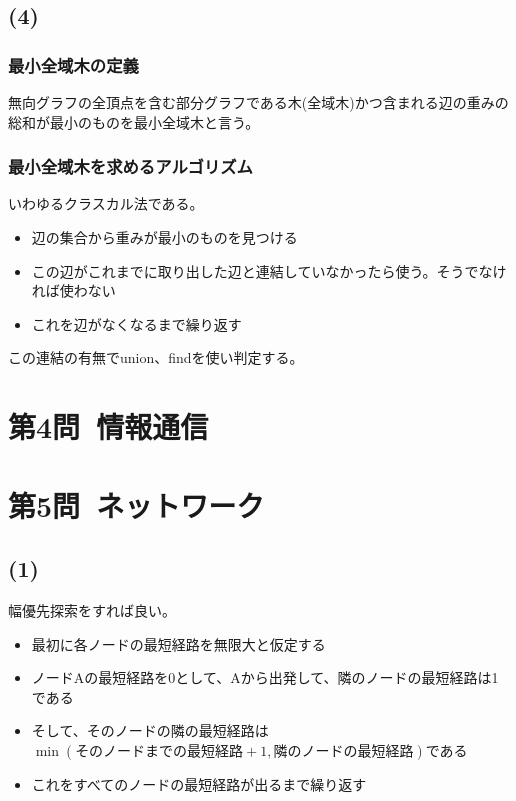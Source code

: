 \documentclass[a4paper,12pt,xelatex,ja=standard]{bxjsarticle}
\begin{document}
\subsection*{(4)}
\subsubsection*{最小全域木の定義}
無向グラフの全頂点を含む部分グラフである木(全域木)かつ含まれる辺の重みの総和が最小のものを最小全域木と言う。

\subsubsection*{最小全域木を求めるアルゴリズム}
いわゆるクラスカル法である。
\begin{itemize}
  \item 辺の集合から重みが最小のものを見つける
  \item この辺がこれまでに取り出した辺と連結していなかったら使う。そうでなければ使わない
  \item これを辺がなくなるまで繰り返す
\end{itemize}

この連結の有無でunion、findを使い判定する。

\section*{第4問\ 情報通信}

\section*{第5問\ ネットワーク}
\subsection*{(1)}
幅優先探索をすれば良い。
\begin{itemize}
  \item 最初に各ノードの最短経路を無限大と仮定する
  \item ノードAの最短経路を0として、Aから出発して、隣のノードの最短経路は1である
  \item そして、そのノードの隣の最短経路は$\min(\text{そのノードまでの最短経路} + 1, \text{隣のノードの最短経路})$である
  \item これをすべてのノードの最短経路が出るまで繰り返す
\end{itemize}
\end{document}
